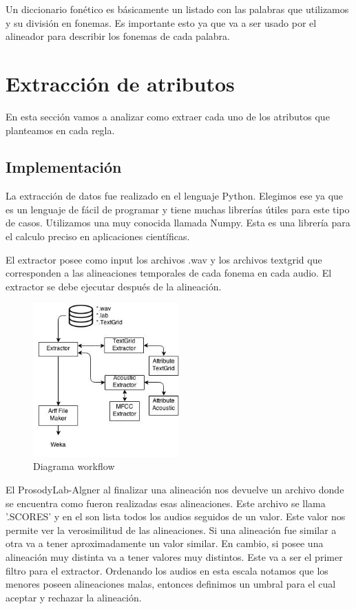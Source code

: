 \documentclass[11pt,a4paper,twoside]{tesis}
\begin{document}
Un diccionario fonético es básicamente un listado con las palabras que utilizamos y su división en fonemas. Es importante esto ya que va a ser usado por el alineador para describir los fonemas de cada palabra.

\section{Extracción de atributos}

En esta sección vamos a analizar como extraer cada uno de los atributos que planteamos en cada regla.

\subsection{Implementación}

La extracción de datos fue realizado en el lenguaje Python. Elegimos ese ya que es un lenguaje de fácil de programar y tiene muchas librerías útiles para este tipo de casos. Utilizamos una muy conocida llamada Numpy. Esta es una librería para el calculo preciso en aplicaciones científicas.

El extractor posee como input los archivos .wav y los archivos textgrid que corresponden a las alineaciones temporales de cada fonema en cada audio. El extractor se debe ejecutar después de la alineación. 

\begin{figure}[h!]
    \centerline{\includegraphics[width=0.5\textwidth]{diagrama_workflow} }
    \caption{Diagrama workflow}
\end{figure}


El ProsodyLab-Algner al finalizar una alineación nos devuelve un archivo donde se encuentra como fueron realizadas esas alineaciones. Este archivo se llama '.SCORES' y en el son lista todos los audios seguidos de un valor. Este valor nos permite ver la verosimilitud de las alineaciones. Si una alineación fue similar a otra va a tener aproximadamente un valor similar. En cambio, si posee una alineación muy distinta va a tener valores muy distintos. Este va a ser el primer filtro para el extractor. Ordenando los audios en esta escala notamos que los menores poseen alineaciones malas, entonces definimos un umbral para el cual aceptar y rechazar la alineación.
\end{document}

